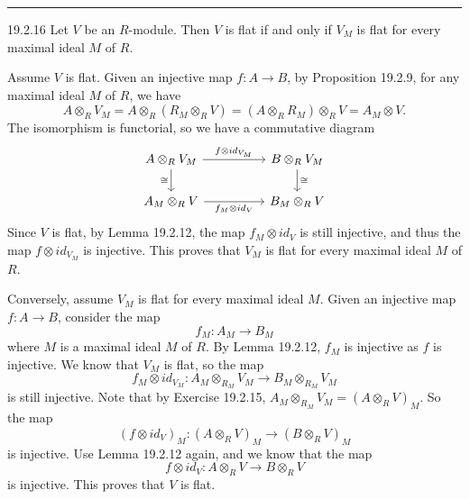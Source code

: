 \documentclass[letterpaper, 12pt]{article}
\begin{document}
\noindent\rule{7in}{2.8pt}
\begin{problem}{19.2.16}
Let \(V\) be an \(R\)-module. Then \(V\) is flat if and only if \(V_M\) is flat for every maximal ideal \(M\) of \(R\).
\end{problem}
\begin{solution}
Assume \(V\) is flat. Given an injective map \(f:A\rightarrow B\), by Proposition 19.2.9, for any maximal ideal \(M\) of \(R\), we have 
\[A\otimes_R V_M=A\otimes_R (R_M\otimes_R V)=(A\otimes_R R_M)\otimes_R V=A_M\otimes V.\]
The isomorphism is functorial, so we have a commutative diagram 
\[\begin{tikzcd}
	{A\otimes_RV_M} && {B\otimes_RV_M} \\
	{A_M\otimes_R V} && {B_M\otimes_RV}
	\arrow["{f\otimes id_{V_M}}", from=1-1, to=1-3]
	\arrow["\cong"', from=1-1, to=2-1]
	\arrow["\cong", from=1-3, to=2-3]
	\arrow["{f_M\otimes id_V}"', from=2-1, to=2-3]
\end{tikzcd}\]
Since \(V\) is flat, by Lemma 19.2.12, the map \(f_M\otimes id_V\) is still injective, and thus the map \(f\otimes id_{V_M}\) is injective. This proves that \(V_M\) is flat for every maximal ideal \(M\) of \(R\).

Conversely, assume \(V_M\) is flat for every maximal ideal \(M\). Given an injective map \(f:A\rightarrow B\), consider the map 
\[f_M:A_M\rightarrow B_M\]
where \(M\) is a maximal ideal \(M\) of \(R\). By Lemma 19.2.12, \(f_M\) is injective as \(f\) is injective. We know that \(V_M\) is flat, so the map 
\[f_M\otimes id_{V_M}:A_M\otimes_{R_M} V_M\rightarrow B_M\otimes_{R_M}V_M\]
is still injective. Note that by Exercise 19.2.15, \(A_M\otimes_{R_M}V_M=(A\otimes_R V)_M\). So the map 
\[(f\otimes id_V)_M:(A\otimes_R V)_M\rightarrow (B\otimes_R V)_M\]
is injective. Use Lemma 19.2.12 again, and we know that the map 
\[f\otimes id_V:A\otimes_R V\rightarrow B\otimes_R V\]
is injective. This proves that \(V\) is flat.
\end{solution}
\end{document}
